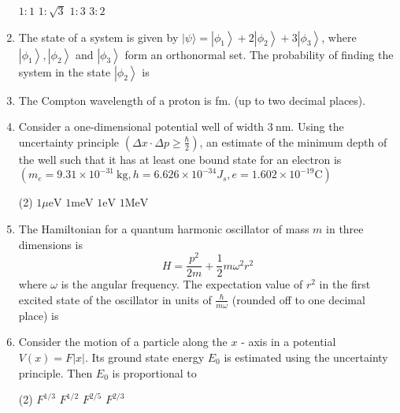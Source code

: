 \begin{enumerate}
\begin{tasks}
	\task[\textbf{A.}] $1: 1$
	\task[\textbf{B.}]$1: \sqrt{3}$
	\task[\textbf{C.}]$1: 3$
	\task[\textbf{D.}] $3: 2$
\end{tasks}
	\item The state of a system is given by $|\psi\rangle=\left|\phi_{1}\right\rangle+2\left|\phi_{2}\right\rangle+3\left|\phi_{3}\right\rangle$, where $\left|\phi_{1}\right\rangle,\left|\phi_{2}\right\rangle$ and $\left|\phi_{3}\right\rangle$ form an orthonormal set. The probability of finding the system in the state $\left|\phi_{2}\right\rangle$ is
	{}
	\item The Compton wavelength of a proton is fm. (up to two decimal places).
	{}
	\item Consider a one-dimensional potential well of width $3 \mathrm{~nm}$. Using the uncertainty principle $\left(\Delta x \cdot \Delta p \geq \frac{\hbar}{2}\right)$, an estimate of the minimum depth of the well such that it has at least one bound state for an electron is $\left(m_{e}=9.31 \times 10^{-31} \mathrm{~kg}, h=6.626 \times 10^{-34} J_{s}, e=1.602 \times 10^{-19} \mathrm{C}\right)$
	{}
\begin{tasks}(2)
	\task[\textbf{A.}] $1 \mu \mathrm{eV}$
	\task[\textbf{B.}]$1 \mathrm{meV}$
	\task[\textbf{C.}]$1 \mathrm{eV}$
	\task[\textbf{D.}]$1 \mathrm{MeV}$
\end{tasks}
	\item The Hamiltonian for a quantum harmonic oscillator of mass $m$ in three dimensions is
	$$
	H=\frac{p^{2}}{2 m}+\frac{1}{2} m \omega^{2} r^{2}
	$$
	where $\omega$ is the angular frequency. The expectation value of $r^{2}$ in the first excited state of the oscillator in units of $\frac{\hbar}{m \omega}$ (rounded off to one decimal place) is
	{}
	\item Consider the motion of a particle along the $x$ - axis in a potential $V(x)=F|x|$. Its ground state energy $E_{0}$ is estimated using the uncertainty principle. Then $E_{0}$ is proportional to
{	}
\begin{tasks}(2)
	\task[\textbf{A.}] $F^{1 / 3}$
	\task[\textbf{B.}] $F^{1 / 2}$
	\task[\textbf{C.}]$F^{2 / 5}$
	\task[\textbf{D.}]$F^{2 / 3}$
\end{tasks}
\end{enumerate}


